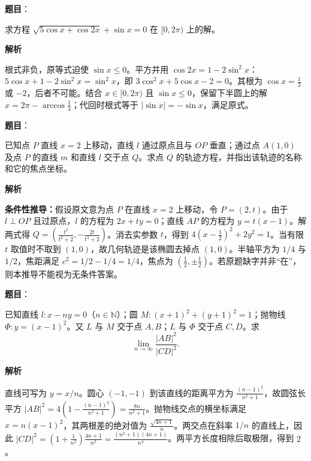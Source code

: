 \begin{answer}

\textbf{题目}：

求方程 $\sqrt{5\cos x+\cos 2x}+\sin x=0$ 在 $[0,2\pi)$ 上的解。

\textbf{解析}

根式非负，原等式迫使 $\sin x\le0$。平方并用 $\cos2x=1-2\sin^2x$：$5\cos x+1-2\sin^2x=\sin^2x$，即 $3\cos^2x+5\cos x-2=0$。其根为 $\cos x=\frac13$ 或 $-2$，后者不可能。结合 $x\in[0,2\pi)$ 且 $\sin x\le0$，保留下半圆上的解 $x=2\pi-\arccos\frac13$；代回时根式等于 $|\sin x|=-\sin x$，满足原式。


\end{answer}
\begin{answer}

\textbf{题目}：

已知点 $P$ 直线 $x=2$ 上移动，直线 $l$ 通过原点且与 $OP$ 垂直；通过点 $A(1,0)$ 及点 $P$ 的直线 $m$ 和直线 $l$ 交于点 $Q$。求点 $Q$ 的轨迹方程，并指出该轨迹的名称和它的焦点坐标。

\textbf{解析}

\textbf{条件性推导：}假设原文意为点 $P$ 在直线 $x=2$ 上移动，令 $P=(2,t)$。由于 $l\perp OP$ 且过原点，$l$ 的方程为 $2x+ty=0$；直线 $AP$ 的方程为 $y=t(x-1)$。解两式得 $Q=(\frac{t^2}{t^2+2},-\frac{2t}{t^2+2})$。消去实参数 $t$，得到 $4(x-\frac12)^2+2y^2=1$。当有限 $t$ 取值时不取到 $(1,0)$，故几何轨迹是该椭圆去掉点 $(1,0)$。半轴平方为 $1/4$ 与 $1/2$，焦距满足 $c^2=1/2-1/4=1/4$，焦点为 $(\frac12,\pm\frac12)$。若原题缺字并非“在”，则本推导不能视为无条件答案。


\end{answer}
\begin{answer}

\textbf{题目}：

已知直线 $l:x-ny=0$（$n\in\mathbb N$）；圆 $M:(x+1)^2+(y+1)^2=1$；抛物线 $\Phi:y=(x-1)^2$。又 $L$ 与 $M$ 交于点 $A,B$；$L$ 与 $\Phi$ 交于点 $C,D$。求
\nopagebreak[4]
\[
\lim_{n\to\infty}\frac{|AB|^2}{|CD|^2}.
\]

\textbf{解析}

直线可写为 $y=x/n$。圆心 $(-1,-1)$ 到该直线的距离平方为 $\frac{(n-1)^2}{n^2+1}$，故圆弦长平方 $|AB|^2=4(1-\frac{(n-1)^2}{n^2+1})=\frac{8n}{n^2+1}$。抛物线交点的横坐标满足 $x=n(x-1)^2$，其两根差的绝对值为 $\frac{\sqrt{4n+1}}n$。两交点在斜率 $1/n$ 的直线上，因此 $|CD|^2=(1+\frac1{n^2})\frac{4n+1}{n^2}=\frac{(n^2+1)(4n+1)}{n^4}$。两平方长度相除后取极限，得到 $2$。


\end{answer}
